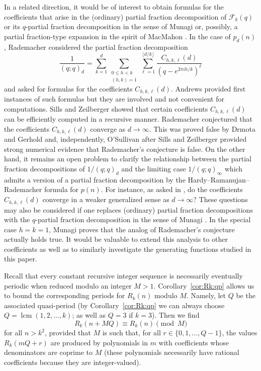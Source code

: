 \documentclass[11pt]{article}
\theoremstyle{plain}
\theoremstyle{definition}
\begin{document}
In a related direction, it would be of interest to obtain formulas for the
coefficients that arise in the (ordinary) partial fraction decomposition of
$\mathcal{F}_k (q)$ or its $q$-partial fraction decomposition in the sense of
Munagi \cite{munagi-qpartial} or, possibly, a partial fraction-type
expansion in the spirit of MacMahon \cite{sills-macmahon}. In the case of
$p_d (n)$, Rademacher \cite[Section~130]{rademacher1} considered the partial
fraction decomposition
\begin{equation*}
  \frac{1}{(q ; q)_d} = \sum_{k = 1}^d \sum_{\substack{
     0 \leq h < k\\
     (h, k) = 1
   }} \sum_{\ell = 1}^{\lfloor d / k \rfloor} \frac{C_{h, k, \ell}
   (d)}{(q - e^{2 \pi i h / k})^{\ell}}
\end{equation*}
and asked for formulas for the coefficients $C_{h, k, \ell} (d)$. Andrews
\cite{andrews-pn-q-mod} provided first instances of such formulas but they
are involved and not convenient for computations. Sills and Zeilberger
\cite{sz-rademacher} showed that certain coefficients $C_{h, k, \ell} (d)$
can be efficiently computed in a recursive manner. Rademacher conjectured that
the coefficients $C_{h, k, \ell} (d)$ converge as $d \rightarrow \infty$. This
was proved false by Drmota and Gerhold \cite{dg-rademacher} and,
independently, O'Sullivan \cite{osullivan-rademacher} after Sills and
Zeilberger \cite{sz-rademacher} provided strong numerical evidence that
Rademacher's conjecture is false. On the other hand, it remains an open
problem to clarify the relationship between the partial fraction
decompositions of $1 / (q ; q)_d$ and the limiting case $1 / (q ; q)_{\infty}$
which admits a version of a partial fraction decomposition by the
Hardy--Ramanujan--Rademacher formula for $p (n)$. For instance, as asked in
\cite{dg-rademacher}, do the coefficients $C_{h, k, \ell} (d)$ converge in a
weaker generalized sense as $d \rightarrow \infty$? These questions may also
be considered if one replaces (ordinary) partial fraction decompositions with
the $q$-partial fraction decomposition in the sense of Munagi
\cite{munagi-qpartial}. In the special case $h = k = 1$, Munagi
\cite{munagi-rademacher} proves that the analog of Rademacher's conjecture
actually holds true. It would be valuable to extend this analysis to other
coefficients as well as to similarly investigate the generating functions
studied in this paper.

Recall that every constant recursive integer sequence is necessarily
eventually periodic when reduced modulo an integer $M > 1$.
Corollary~\ref{cor:Rk:qp} allows us to bound the corresponding periods for
$R_k (n)$ modulo $M$. Namely, let $Q$ be the associated quasi-period (by
Corollary~\ref{cor:Rk:qp} we can always choose $Q = \operatorname{lcm} (1, 2, \ldots,
k)$; as well as $Q = 3$ if $k = 3$). Then we find
\begin{equation*}
  R_k (n + M Q) \equiv R_k (n) \pmod{M}
\end{equation*}
for all $n > k^2$, provided that $M$ is such that, for all $r \in \{ 0, 1,
\ldots, Q - 1 \}$, the values $R_k (m Q + r)$ are produced by polynomials in
$m$ with coefficients whose denominators are coprime to $M$ (these polynomials
necessarily have rational coefficients because they are integer-valued).
\end{document}
